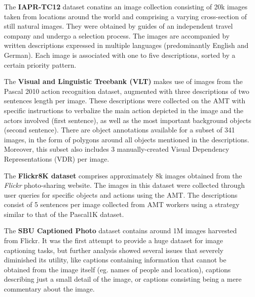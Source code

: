 The \textbf{IAPR-TC12} dataset \citep{Escalante2010} conatins an image collection consisting of 20k images taken from locations around the world and comprising a varying cross-section of still natural images. They were obtained by guides of an independent travel company and undergo a selection process. The images are accompanied by written descriptions expressed in multiple languages (predominantly English and German). Each image is associated with one to five descriptions, sorted by a certain priority pattern.

The \textbf{Visual and Linguistic Treebank (VLT)}  \citep{Elliott2013} makes use of images from the Pascal 2010 action recognition dataset, augmented with three descriptions of two sentences length per image. These descriptions were collected on the AMT with specific instructions to verbalize the main action depicted in the image and the actors involved (first sentence), as well as the most important background objects (second sentence). There are object annotations available for a subset of 341 images, in the form of polygons around all objects mentioned in the descriptions. Moreover, this subset also includes 3 manually-created Visual Dependency Representations (VDR) per image. 

The \textbf{Flickr8K dataset} \citep{Rashtchian2010} comprises approximately 8k images obtained from the \textit{Flickr} photo-sharing website. The images in this dataset were collected through user queries for specific objects and actions using the AMT. The descriptions consist of 5 sentences per image collected from AMT workers using a strategy similar to that of the Pascal1K dataset. 

The \textbf{SBU Captioned Photo} dataset \citep{Ordonez2011} contains around 1M images harvested from Flickr. It was the first attempt to provide a huge dataset for image captioning tasks, but further analysis showed several issues that severely diminished its utility, like captions containing information that cannot be obtained from the image itself (eg. names of people and location), captions describing just a small detail of the image, or captions consisting being a mere commentary about the image.

